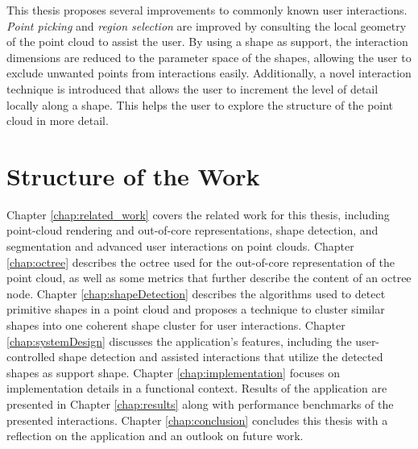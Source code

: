 \par

This thesis proposes several improvements to commonly known user interactions. \textit{Point picking} and \textit{region selection} are improved by consulting the local geometry of the point cloud to assist the user. By using a shape as support, the interaction dimensions are reduced to the parameter space of the shapes, allowing the user to exclude unwanted points from interactions easily. 
Additionally, a novel interaction technique is introduced that allows the user to increment the level of detail locally along a shape. This helps the user to explore the structure of the point cloud in more detail. 


\section{Structure of the Work}

Chapter \ref{chap:related_work} covers the related work for this thesis, including point-cloud rendering and out-of-core representations, shape detection, and segmentation and advanced user interactions on point clouds. Chapter \ref{chap:octree} describes the octree used for the out-of-core representation of the point cloud, as well as some metrics that further describe the content of an octree node. Chapter \ref{chap:shapeDetection} describes the algorithms used to detect primitive shapes in a point cloud and proposes a technique to cluster similar shapes into one coherent shape cluster for user interactions. Chapter \ref{chap:systemDesign} discusses the application's features, including the user-controlled shape detection and assisted interactions that utilize the detected shapes as support shape. Chapter \ref{chap:implementation} focuses on implementation details in a functional context. Results of the application are presented in Chapter \ref{chap:results} along with performance benchmarks of the presented interactions. Chapter \ref{chap:conclusion} concludes this thesis with a reflection on the application and an outlook on future work. 
